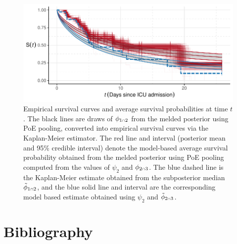 \documentclass[
  10pt,
  a4paper,
]{article}
\let\Oldcap\cap
\renewcommand{\cap}{\mathrel{\mathsmaller{\Oldcap}}}
\begin{document}
\begin{figure}

{\centering \includegraphics{../plots/mimic-example/kaplan-meier-pc} 

}

\caption{Empirical survival curves and average survival probabilities at time $t$. The black lines are draws of $\phi_{1 \cap 2}$ from the melded posterior using PoE pooling, converted into empirical survival curves via the Kaplan-Meier estimator. The red line and interval (posterior mean and 95\% credible interval) denote the model-based average survival probability obtained from the melded posterior using PoE pooling computed from the values of $\psi_{2}$ and $\phi_{2 \cap 3}$. The blue dashed line is the Kaplan-Meier estimate obtained from the subposterior median $\tilde{\phi}_{1 \cap 2}$, and the blue solid line and interval are the corresponding model based estimate obtained using $\psi_{2}$ and $\tilde{\phi}_{2 \cap 3}$.}\label{fig:kap_meier_pc_plot}
\end{figure}

\hypertarget{bibliography}{%
\section{Bibliography}\label{bibliography}}
\end{document}
